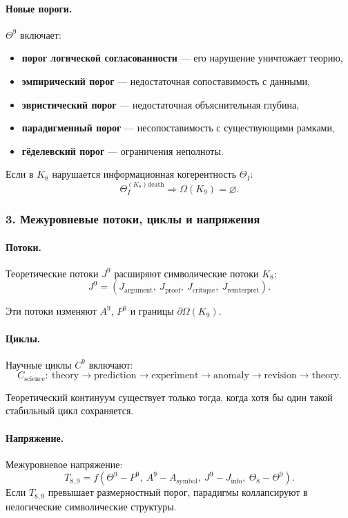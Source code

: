 \paragraph{Новые пороги.}
$\Theta^9$ включает:
\begin{itemize}
  \item \textbf{порог логической согласованности} — его нарушение уничтожает
        теорию,
  \item \textbf{эмпирический порог} — недостаточная сопоставимость с данными,
  \item \textbf{эвристический порог} — недостаточная объяснительная глубина,
  \item \textbf{парадигменный порог} — несопоставимость с существующими рамками,
  \item \textbf{гёделевский порог} — ограничения неполноты.
\end{itemize}

Если в $K_8$ нарушается информационная когерентность $\Theta_I$:
\[
\Theta_I^{(K_8)\mathrm{death}} \Rightarrow \Omega(K_9)=\varnothing.
\]

\subsubsection{3. Межуровневые потоки, циклы и напряжения}

\paragraph{Потоки.}
Теоретические потоки $J^9$ расширяют символические потоки $K_8$:
\[
J^9 = (J_{\mathrm{argument}},\ J_{\mathrm{proof}},\
       J_{\mathrm{critique}},\ J_{\mathrm{reinterpret}}).
\]

Эти потоки изменяют $A^9$, $P^9$ и границы $\partial\Omega(K_9)$.

\paragraph{Циклы.}
Научные циклы $C^9$ включают:
\[
C_{\mathrm{science}}:\
\text{theory} \rightarrow \text{prediction} \rightarrow \text{experiment}
\rightarrow \text{anomaly} \rightarrow \text{revision} \rightarrow \text{theory}.
\]

Теоретический континуум существует только тогда, когда хотя бы один такой
стабильный цикл сохраняется.

\paragraph{Напряжение.}
Межуровневое напряжение:
\[
T_{8,9} =
f(\Theta^9 - P^9,\ A^9 - A_{\mathrm{symbol}},\
  J^9 - J_{\mathrm{info}},\ \Theta_8 - \Theta^9).
\]
Если $T_{8,9}$ превышает размерностный порог, парадигмы коллапсируют в
нелогические символические структуры.

